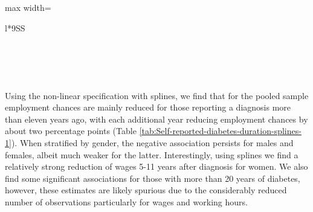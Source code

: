 \documentclass[12pt,english,british]{article}
\newcommand{\sym}[1]{\rlap{#1}}%
\begin{document}
\begin{table}[h]
\begin{center}
\begin{adjustbox}{max width=\textwidth}
{\begin{tabular}{l*{9}{SS}}
\\
\\
\\
\\
\multicolumn{10}{l}{\footnotesize \sym{*} \(p<0.10\), \sym{**} \(p<0.05\), \sym{***} \(p<0.01\)}\\
\end{tabular}
}

\end{adjustbox}
\end{center}
\end{table}  
  
  
  
Using the non-linear specification with splines, we find that for the pooled sample employment chances
are mainly reduced for those reporting a diagnosis more than eleven years
ago, with each additional year reducing employment chances by about
two percentage points (Table \ref{tab:Self-reported-diabetes-duration-splines-1}).
When stratified by gender, the
negative association persists for males and females, albeit much weaker for the latter. Interestingly, using splines
we find a relatively strong reduction of wages 5-11 years after diagnosis
for women. We also find some significant associations for those with more than 20 years of diabetes, however, these estimates are likely spurious due to the considerably reduced number of observations particularly for wages and working hours.
\end{document}
